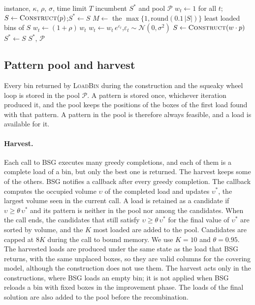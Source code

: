 \begin{algorithm}[t]
\caption{Squeaky wheel optimisation}
\label{alg:swo}
\begin{algorithmic}[1]
\Require instance, $\kappa$, $\rho$, $\sigma$, time limit $T$
\Ensure incumbent $S^*$ and pool $\mathcal{P}$
\State $w_t\gets 1$ for all $t$;\quad $S\gets \textsc{Construct}(p)$;\quad $S^*\gets S$
  \State $M\gets$ the $\max\{1,\mathrm{round}(0.1\,|S|)\}$ least loaded bins of $S$
     $w_t\gets(1+\rho)\,w_t$ \EndIf
    \State $w_t\gets w_t\,e^{\varepsilon_t}$,\quad $\varepsilon_t\sim\mathcal{N}(0,\sigma^2)$
  \EndFor
  \State $S\gets \textsc{Construct}(w\cdot p)$
   $S^*\gets S$ \EndIf
\EndWhile
\State \Return $S^*$, $\mathcal{P}$
\end{algorithmic}
\end{algorithm}

\subsection{Pattern pool and harvest}
\label{sec:m-pool}

Every bin returned by \textsc{LoadBin} during the construction and the squeaky wheel loop is
stored in the pool $\mathcal{P}$. A pattern is stored once, whichever iteration produced it, and
the pool keeps the positions of the boxes of the first load found with that pattern. A pattern
in the pool is therefore always feasible, and a load is available for it.

\paragraph{Harvest.}
Each call to BSG executes many greedy completions, and each of them is a complete load of a bin,
but only the best one is returned. The harvest keeps some of the others. BSG notifies a callback
after every greedy completion. The callback computes the occupied volume $\upsilon$ of the
completed load and updates $\upsilon^*$, the largest volume seen in the current call. A load is
retained as a candidate if $\upsilon\ge\theta\,\upsilon^*$ and its pattern is neither in the pool
nor among the candidates. When the call ends, the candidates that still satisfy
$\upsilon\ge\theta\,\upsilon^*$ for the final value of $\upsilon^*$ are sorted by volume, and the
$K$ most loaded are added to the pool. Candidates are capped at $8K$ during the call to bound
memory. We use $K=10$ and $\theta=0.95$. The harvested loads are produced under the same state as
the load that BSG returns, with the same unplaced boxes, so they are valid columns for the covering
model, although the construction does not use them. The harvest acts only in the constructions,
where BSG loads an empty bin; it is not applied when BSG reloads a bin with fixed boxes in the
improvement phase. The loads of the final solution are also added to the pool before the recombination.

